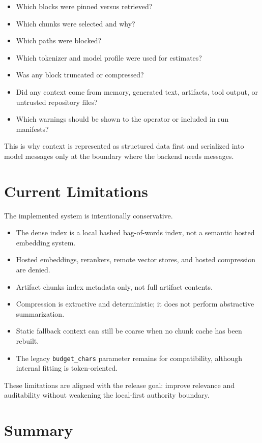 \documentclass[11pt]{article}
\begin{document}
\begin{itemize}[leftmargin=*]
  \item Which blocks were pinned versus retrieved?
  \item Which chunks were selected and why?
  \item Which paths were blocked?
  \item Which tokenizer and model profile were used for estimates?
  \item Was any block truncated or compressed?
  \item Did any context come from memory, generated text, artifacts, tool output, or untrusted repository files?
  \item Which warnings should be shown to the operator or included in run manifests?
\end{itemize}

This is why context is represented as structured data first and serialized into model messages only at the boundary where the backend needs messages.

\section{Current Limitations}

The implemented system is intentionally conservative.

\begin{itemize}[leftmargin=*]
  \item The dense index is a local hashed bag-of-words index, not a semantic hosted embedding system.
  \item Hosted embeddings, rerankers, remote vector stores, and hosted compression are denied.
  \item Artifact chunks index metadata only, not full artifact contents.
  \item Compression is extractive and deterministic; it does not perform abstractive summarization.
  \item Static fallback context can still be coarse when no chunk cache has been rebuilt.
  \item The legacy \texttt{budget\_chars} parameter remains for compatibility, although internal fitting is token-oriented.
\end{itemize}

These limitations are aligned with the release goal: improve relevance and auditability without weakening the local-first authority boundary.

\section{Summary}
\end{document}
